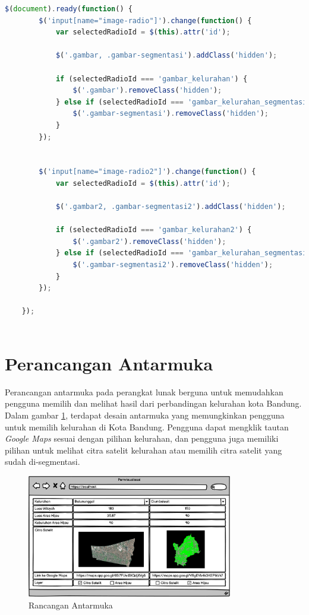 \begin{lstlisting}[language=JavaScript, caption=Fungsi Radio Button,label={code:jsradio}]
	 $(document).ready(function() {
		$('input[name="image-radio"]').change(function() {
			var selectedRadioId = $(this).attr('id');
			
			$('.gambar, .gambar-segmentasi').addClass('hidden');
			
			if (selectedRadioId === 'gambar_kelurahan') {
				$('.gambar').removeClass('hidden');
			} else if (selectedRadioId === 'gambar_kelurahan_segmentasi') {
				$('.gambar-segmentasi').removeClass('hidden');
			}
		});
		
		
		$('input[name="image-radio2"]').change(function() {
			var selectedRadioId = $(this).attr('id');
			
			$('.gambar2, .gambar-segmentasi2').addClass('hidden');
			
			if (selectedRadioId === 'gambar_kelurahan2') {
				$('.gambar2').removeClass('hidden');
			} else if (selectedRadioId === 'gambar_kelurahan_segmentasi2') {
				$('.gambar-segmentasi2').removeClass('hidden');
			}
		});
		
	});
	
\end{lstlisting}

\section{Perancangan Antarmuka}
\label{sec:antarmuka}
Perancangan antarmuka pada perangkat lunak berguna untuk memudahkan pengguna memilih dan melihat hasil dari perbandingan kelurahan kota Bandung. Dalam gambar \ref{fig:rancanganAntarmuka}, terdapat desain antarmuka yang memungkinkan pengguna untuk memilih kelurahan di Kota Bandung. Pengguna dapat mengklik tautan \textit{Google Maps} sesuai dengan pilihan kelurahan, dan pengguna juga memiliki pilihan untuk melihat citra satelit kelurahan atau memilih citra satelit yang sudah di-segmentasi.

\begin{figure}[H]
	\centering
	\includegraphics[width=0.8\textwidth]{Gambar/perancangan.png}
	\caption{Rancangan Antarmuka}
	\label{fig:rancanganAntarmuka}
\end{figure} 